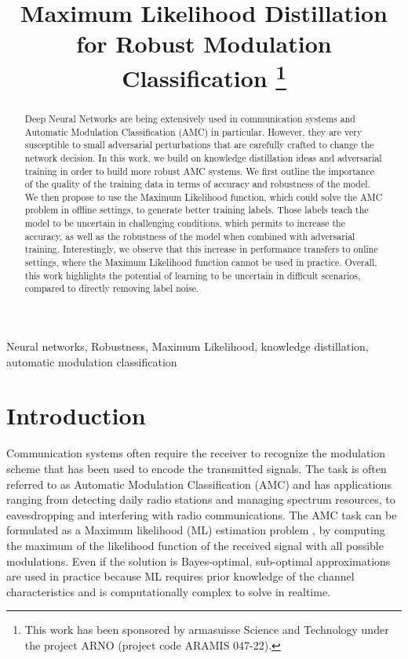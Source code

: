 \documentclass[conference]{IEEEtran}
\title{Maximum Likelihood Distillation for Robust Modulation Classification
\thanks{This work has been sponsored by armasuisse Science and Technology under the project ARNO (project code ARAMIS 047-22).}
}
\author{\IEEEauthorblockN{Javier Maroto}
\IEEEauthorblockA{\textit{Signal Processing Laboratory (LTS4)} \\ \textit{EPFL, Switzerland}}
\and
\IEEEauthorblockN{Gérôme Bovet}
\IEEEauthorblockA{\textit{armasuisse Science\&Technology} \\
\textit{Cyber-Defence Campus, Switzerland}}
\and
\IEEEauthorblockN{Pascal Frossard}
\IEEEauthorblockA{\textit{Signal Processing Laboratory (LTS4)} \\ \textit{EPFL, Switzerland}}}
\newcommand{\pf}[1]{{\textcolor{orange}{PF: {#1}}}}
\begin{document}
\maketitle

\begin{abstract}
Deep Neural Networks are being extensively used in communication systems and Automatic Modulation Classification (AMC) in particular. However, they are very susceptible to small adversarial perturbations that are carefully crafted to change the network decision. In this work, we build on knowledge distillation ideas and adversarial training in order to build more robust AMC systems. We first outline the importance of the quality of the training data in terms of accuracy and robustness of the model. We then propose to use the Maximum Likelihood function, which could solve the AMC problem in offline settings, to generate better training labels. Those labels teach the model to be uncertain in challenging conditions, which permits to increase the accuracy, as well as the robustness of the model when combined with adversarial training. Interestingly, we observe that this increase in performance transfers to online settings, where the Maximum Likelihood function cannot be used in practice. Overall, this work highlights the potential of learning to be uncertain in difficult scenarios, compared to directly removing label noise.
\end{abstract}

\begin{IEEEkeywords}
Neural networks, Robustness, Maximum Likelihood, knowledge distillation, automatic modulation classification
\end{IEEEkeywords}

\section{Introduction}

Communication systems often require the receiver to recognize the modulation scheme that has been used to encode the transmitted signals. The task is often referred to as Automatic Modulation Classification (AMC) and has applications ranging from detecting daily radio stations and managing spectrum resources, to eavesdropping and interfering with radio communications. The AMC task can be formulated as a Maximum likelihood (ML) estimation problem \cite{huan1995likelihood,dobre2007survey,hameed2009likelihood}, by computing the maximum of the likelihood function of the received signal with all possible modulations. Even if the solution is Bayes-optimal, sub-optimal approximations are used in practice \cite{dobre2007survey,Hameed_Dobre_Popescu_2009} because ML requires prior knowledge of the channel characteristics and is computationally complex to solve in realtime.
\end{document}
